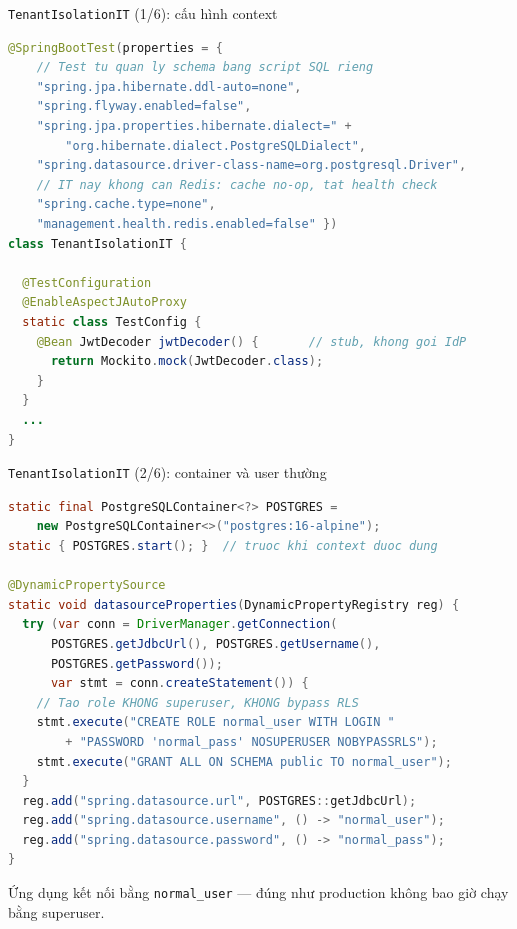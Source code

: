 \documentclass[aspectratio=169,12pt]{beamer}
\begin{document}
\begin{frame}[fragile]{\texttt{TenantIsolationIT} (1/6): cấu hình context}
  \vspace*{-0.6em}
\begin{lstlisting}[language=Java,style=codesm]
@SpringBootTest(properties = {
    // Test tu quan ly schema bang script SQL rieng
    "spring.jpa.hibernate.ddl-auto=none",
    "spring.flyway.enabled=false",
    "spring.jpa.properties.hibernate.dialect=" +
        "org.hibernate.dialect.PostgreSQLDialect",
    "spring.datasource.driver-class-name=org.postgresql.Driver",
    // IT nay khong can Redis: cache no-op, tat health check
    "spring.cache.type=none",
    "management.health.redis.enabled=false" })
class TenantIsolationIT {

  @TestConfiguration
  @EnableAspectJAutoProxy
  static class TestConfig {
    @Bean JwtDecoder jwtDecoder() {       // stub, khong goi IdP
      return Mockito.mock(JwtDecoder.class);
    }
  }
  ...
}
\end{lstlisting}
\end{frame}

\begin{frame}[fragile]{\texttt{TenantIsolationIT} (2/6): container và user thường}
  \vspace*{-0.4em}
\begin{lstlisting}[language=Java,style=codesm]
static final PostgreSQLContainer<?> POSTGRES =
    new PostgreSQLContainer<>("postgres:16-alpine");
static { POSTGRES.start(); }  // truoc khi context duoc dung

@DynamicPropertySource
static void datasourceProperties(DynamicPropertyRegistry reg) {
  try (var conn = DriverManager.getConnection(
      POSTGRES.getJdbcUrl(), POSTGRES.getUsername(),
      POSTGRES.getPassword());
      var stmt = conn.createStatement()) {
    // Tao role KHONG superuser, KHONG bypass RLS
    stmt.execute("CREATE ROLE normal_user WITH LOGIN "
        + "PASSWORD 'normal_pass' NOSUPERUSER NOBYPASSRLS");
    stmt.execute("GRANT ALL ON SCHEMA public TO normal_user");
  }
  reg.add("spring.datasource.url", POSTGRES::getJdbcUrl);
  reg.add("spring.datasource.username", () -> "normal_user");
  reg.add("spring.datasource.password", () -> "normal_pass");
}
\end{lstlisting}
  \small Ứng dụng kết nối bằng \texttt{normal\_user} --- đúng như production
  không bao giờ chạy bằng superuser.
\end{frame}
\end{document}
